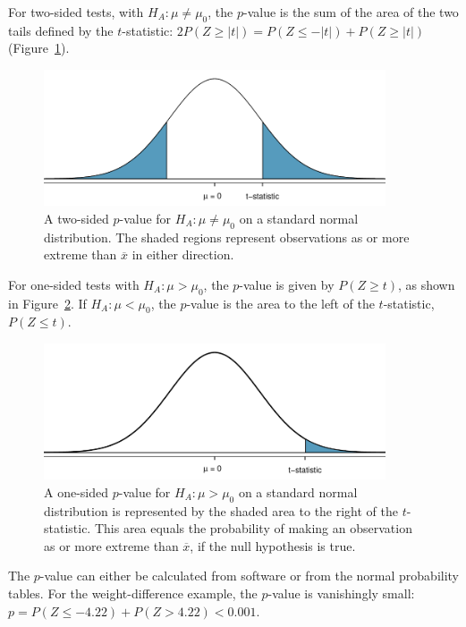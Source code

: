 For two-sided tests, with $H_A: \mu \neq \mu_0$, the $p$-value is the sum of the area of the two tails defined by the $t$-statistic: $2 P(Z \geq |t|) = P(Z \leq -|t|) + P(Z \geq |t|)$ (Figure~\ref{pValueTwoSided}).

\begin{figure}[h]
	\centering
	\includegraphics[width=0.9\textwidth]{ch_inference_foundations_oi_biostat/figures/pValueTwoSided/pValueTwoSided}
	\caption{A two-sided $p$-value for $H_A: \mu \neq \mu_0$ on a standard normal distribution. The shaded regions represent observations as or more extreme than $\overline{x}$ in either direction.}
	\label{pValueTwoSided}
\end{figure}

For one-sided tests with $H_A: \mu > \mu_0$, the $p$-value is given by $P(Z \geq t)$, as shown in Figure~\ref{pValueOneSided}. If $H_A: \mu < \mu_0$, the $p$-value is the area to the left of the $t$-statistic, $P(Z \leq t)$.

\begin{figure}[h]
	\centering
	\includegraphics[width=0.9\textwidth]{ch_inference_foundations_oi_biostat/figures/pValueOneSided/pValueOneSided}
	\caption{A one-sided $p$-value for $H_A: \mu > \mu_0$ on a standard normal distribution is represented by the shaded area to the right of the $t$-statistic. This area equals the probability of making an observation as or more extreme than $\overline{x}$, if the null hypothesis is true.}
	\label{pValueOneSided}
\end{figure}


The $p$-value can either be calculated from software or from the normal probability tables. For the weight-difference example, the $p$-value is vanishingly small: $p = P(Z \leq - 4.22) + P(Z > 4.22)< 0.001$.


